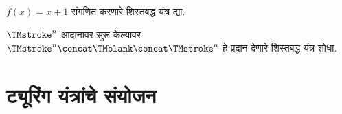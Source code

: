 \begin{prob}\label{tur:mac:dis:prob:disc-succ}
$f(x) = x+1$ संगणित करणारे शिस्तबद्ध यंत्र द्या.
\end{prob}


\begin{prob}\label{tur:mac:dis:prob:copier}
$\TMstroke^n$ आदानावर सुरू केल्यावर
$\TMstroke^n \concat \TMblank \concat \TMstroke^n$ हे प्रदान
देणारे शिस्तबद्ध यंत्र शोधा.
\end{prob}











\section{ट्यूरिंग यंत्रांचे संयोजन}\label{tur:mac:cmb:sec}

